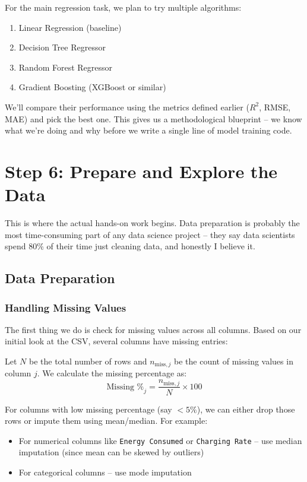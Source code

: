 \documentclass[12pt, a4paper]{article}
\begin{document}
For the main regression task, we plan to try multiple algorithms:
\begin{enumerate}
    \item Linear Regression (baseline)
    \item Decision Tree Regressor
    \item Random Forest Regressor
    \item Gradient Boosting (XGBoost or similar)
\end{enumerate}

We'll compare their performance using the metrics defined earlier ($R^2$, RMSE, MAE) and pick the best one. This gives us a methodological blueprint -- we know what we're doing and why before we write a single line of model training code.

\newpage

\section{Step 6: Prepare and Explore the Data}

This is where the actual hands-on work begins. Data preparation is probably the most time-consuming part of any data science project -- they say data scientists spend 80\% of their time just cleaning data, and honestly I believe it.

\subsection{Data Preparation}

\subsubsection{Handling Missing Values}

The first thing we do is check for missing values across all columns. Based on our initial look at the CSV, several columns have missing entries:

Let $N$ be the total number of rows and $n_{\text{miss},j}$ be the count of missing values in column $j$. We calculate the missing percentage as:
$$\text{Missing \%}_j = \frac{n_{\text{miss},j}}{N} \times 100$$

For columns with low missing percentage (say $< 5\%$), we can either drop those rows or impute them using mean/median. For example:
\begin{itemize}
    \item For numerical columns like \texttt{Energy Consumed} or \texttt{Charging Rate} -- use median imputation (since mean can be skewed by outliers)
    \item For categorical columns -- use mode imputation
\end{itemize}
\end{document}
